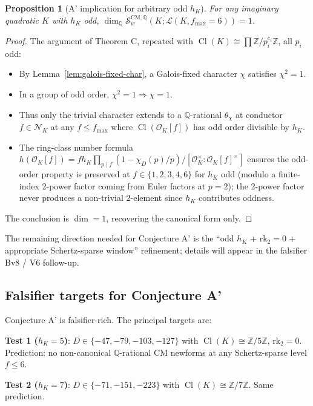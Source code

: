 \documentclass[11pt,a4paper]{amsart}
\newtheorem{proposition}[theorem]{Proposition}
\theoremstyle{definition}
\DeclareMathOperator{\Cl}{Cl}
\newcommand{\Q}{\mathbb{Q}}
\newcommand{\Z}{\mathbb{Z}}
\newcommand{\OK}{\mathcal{O}_K}
\newcommand{\Lcal}{\mathcal{L}}
\newcommand{\Ncal}{\mathcal{N}}
\newcommand{\Scal}{\mathcal{S}}
\newcommand{\hK}{h_{K}}
\newcommand{\rktwo}{\mathrm{rk}_2}
\begin{document}
\begin{proposition}[A' implication for arbitrary odd $\hK$]\label{prop:A-prime-odd}
For any imaginary quadratic $K$ with $\hK$ odd, $\dim_\Q \Scal_w^{\mathrm{CM}, \Q}(K; \Lcal(K, f_{\max} = 6)) = 1$.
\end{proposition}

\begin{proof}
The argument of Theorem C, repeated with $\Cl(K) \cong \prod \Z/p_i^{e_i}\Z$, all $p_i$ odd:
\begin{itemize}[leftmargin=2em]
  \item By Lemma~\ref{lem:galois-fixed-char}, a Galois-fixed character $\chi$ satisfies $\chi^2 = 1$.
  \item In a group of odd order, $\chi^2 = 1 \Rightarrow \chi = 1$.
  \item Thus only the trivial character extends to a $\Q$-rational $\theta_\chi$ at conductor $f \in \Ncal_K$ at any $f \le f_{\max}$ where $\Cl(\OK[f])$ has odd order divisible by $\hK$.
  \item The ring-class number formula $h(\OK[f]) = f \hK \prod_{p \mid f}(1 - \chi_D(p)/p) / [\OK^\times : \OK[f]^\times]$ ensures the odd-order property is preserved at $f \in \{1, 2, 3, 4, 6\}$ for $\hK$ odd (modulo a finite-index $2$-power factor coming from Euler factors at $p = 2$); the 2-power factor never produces a non-trivial $2$-element since $h_K$ contributes oddness.
\end{itemize}
The conclusion is $\dim = 1$, recovering the canonical form only.
\end{proof}

The remaining direction needed for Conjecture A' is the ``odd $\hK$ + $\rktwo = 0$ + appropriate Schertz-sparse window'' refinement; details will appear in the falsifier Bv8 / V6 follow-up.

\subsection{Falsifier targets for Conjecture A'}\label{sec:conjA-prime-falsifiers}

Conjecture A' is falsifier-rich. The principal targets are:

\textbf{Test 1 ($\hK = 5$)}: $D \in \{-47, -79, -103, -127\}$ with $\Cl(K) \cong \Z/5\Z$, $\rktwo = 0$. Prediction: no non-canonical $\Q$-rational CM newforms at any Schertz-sparse level $f \le 6$.

\textbf{Test 2 ($\hK = 7$)}: $D \in \{-71, -151, -223\}$ with $\Cl(K) \cong \Z/7\Z$. Same prediction.
\end{document}
